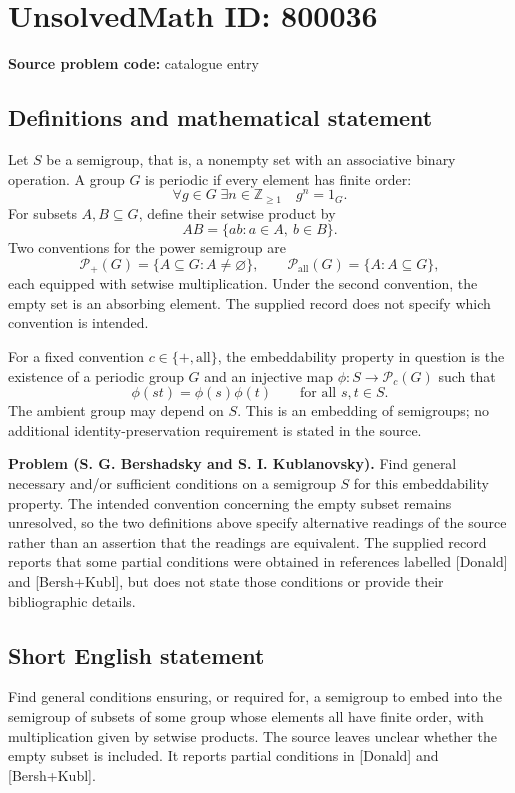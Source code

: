 \documentclass[11pt]{article}
\newcommand{\Z}{\mathbb{Z}}
\begin{document}
\section*{UnsolvedMath ID: 800036}
\textbf{Source problem code:} catalogue entry
\subsection{Definitions and mathematical statement}
Let \(S\) be a semigroup, that is, a nonempty set with an associative binary operation. A group \(G\) is periodic if every element has finite order:
\[
\forall g\in G\;\exists n\in\Z_{\geq 1}\quad g^n=1_G.
\]
For subsets \(A,B\subseteq G\), define their setwise product by
\[
AB=\{ab:a\in A,\ b\in B\}.
\]
Two conventions for the power semigroup are
\[
\mathcal P_{+}(G)=\{A\subseteq G:A\ne\varnothing\},
\qquad
\mathcal P_{\mathrm{all}}(G)=\{A:A\subseteq G\},
\]
each equipped with setwise multiplication. Under the second convention, the empty set is an absorbing element. The supplied record does not specify which convention is intended.

For a fixed convention \(c\in\{+,\mathrm{all}\}\), the embeddability property in question is the existence of a periodic group \(G\) and an injective map \(\phi:S\to\mathcal P_c(G)\) such that
\[
\phi(st)=\phi(s)\phi(t)\qquad\text{for all }s,t\in S.
\]
The ambient group may depend on \(S\). This is an embedding of semigroups; no additional identity-preservation requirement is stated in the source.

\textbf{Problem (S. G. Bershadsky and S. I. Kublanovsky).} Find general necessary and/or sufficient conditions on a semigroup \(S\) for this embeddability property. The intended convention concerning the empty subset remains unresolved, so the two definitions above specify alternative readings of the source rather than an assertion that the readings are equivalent. The supplied record reports that some partial conditions were obtained in references labelled [Donald] and [Bersh+Kubl], but does not state those conditions or provide their bibliographic details.
\subsection{Short English statement}
Find general conditions ensuring, or required for, a semigroup to embed into the semigroup of subsets of some group whose elements all have finite order, with multiplication given by setwise products. The source leaves unclear whether the empty subset is included. It reports partial conditions in [Donald] and [Bersh+Kubl].
\end{document}
